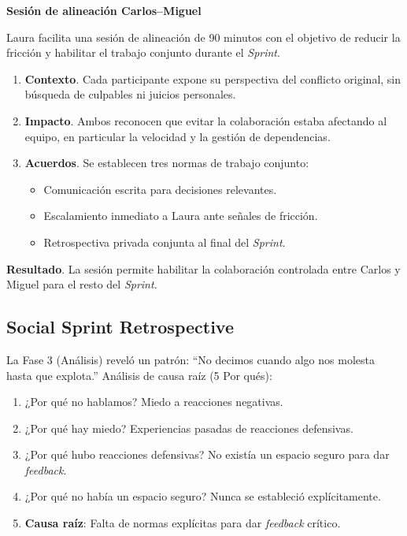 \begin{escenario}

    \textbf{Sesión de alineación Carlos–Miguel}

    Laura facilita una sesión de alineación de 90 minutos con el objetivo
    de reducir la fricción y habilitar el trabajo conjunto durante el \textit{Sprint}.

    \begin{enumerate}
        \item \textbf{Contexto}. Cada participante expone su perspectiva del conflicto original,
              sin búsqueda de culpables ni juicios personales.

        \item \textbf{Impacto}. Ambos reconocen que evitar la colaboración estaba afectando
              al equipo, en particular la velocidad y la gestión de dependencias.

        \item \textbf{Acuerdos}. Se establecen tres normas de trabajo conjunto:
              \begin{itemize}
                  \item Comunicación escrita para decisiones relevantes.
                  \item Escalamiento inmediato a Laura ante señales de fricción.
                  \item Retrospectiva privada conjunta al final del \textit{Sprint}.
              \end{itemize}
    \end{enumerate}

    \textbf{Resultado}. La sesión permite habilitar la colaboración controlada
    entre Carlos y Miguel para el resto del \textit{Sprint}.

\end{escenario}

\subsection{Social Sprint Retrospective}

La Fase 3 (Análisis) reveló un patrón: ``No decimos cuando algo nos molesta hasta que explota.''
Análisis de causa raíz (5 Por qués):
\begin{enumerate}
    \item ¿Por qué no hablamos?
          Miedo a reacciones negativas.
    \item ¿Por qué hay miedo?
          Experiencias pasadas de reacciones defensivas.
    \item ¿Por qué hubo reacciones defensivas?
          No existía un espacio seguro para dar \textit{feedback}.
    \item ¿Por qué no había un espacio seguro?
          Nunca se estableció explícitamente.
    \item \textbf{Causa raíz}: Falta de normas explícitas para dar \textit{feedback} crítico.
\end{enumerate}

